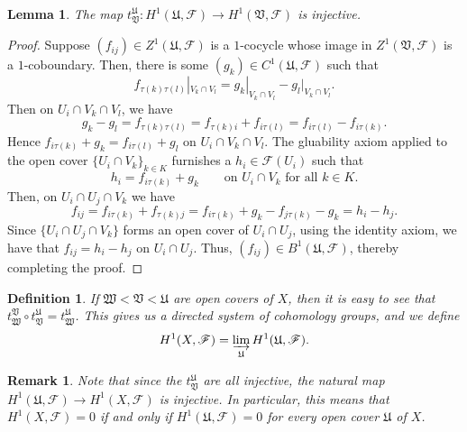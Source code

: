 \documentclass[12pt]{article}
\theoremstyle{thmstyle}
\newtheorem{lemma}[theorem]{Lemma}
\theoremstyle{defstyle}
\newtheorem{definition}[theorem]{Definition}
\newtheorem{remark}[theorem]{Remark}
\newcommand{\frakU}{\mathfrak{U}}
\newcommand{\frakV}{\mathfrak{V}}
\newcommand{\frakW}{\mathfrak{W}}
\newcommand{\scrF}{\mathscr F}
\begin{document}
\begin{lemma}
    The map $t^{\frakU}_{\frakV}: H^1(\frakU,\scrF)\to H^1(\frakV,\scrF)$ is injective.
\end{lemma}
\begin{proof}
    Suppose $(f_{ij})\in Z^1(\frakU,\scrF)$ is a $1$-cocycle whose image in $Z^1(\frakV,\scrF)$ is a $1$-coboundary. Then, there is some $(g_k)\in C^1(\frakU,\scrF)$ such that 
    \begin{equation*}
        f_{\tau(k)\tau(l)}|_{V_k\cap V_l} = g_k|_{V_k\cap V_l} - g_l|_{V_k\cap V_l}.
    \end{equation*}
    Then on $U_i\cap V_k\cap V_l$, we have 
    \begin{equation*}
        g_k - g_l = f_{\tau(k)\tau(l)} = f_{\tau(k)i} + f_{i\tau(l)} = f_{i\tau(l)} - f_{i\tau(k)}.
    \end{equation*}
    Hence $f_{i\tau(k)} + g_k = f_{i\tau(l)} + g_l$ on $U_i\cap V_k\cap V_l$. The gluability axiom applied to the open cover $\{U_i\cap V_k\}_{k\in K}$ furnishes a $h_i\in\scrF(U_i)$ such that 
    \begin{equation*}
        h_i = f_{i\tau(k)} + g_k\qquad\text{on } U_i\cap V_k\text{ for all }k\in K.
    \end{equation*}
    Then, on $U_i\cap U_j\cap V_k$ we have 
    \begin{equation*}
        f_{ij} = f_{i\tau(k)} + f_{\tau(k)j} = f_{i\tau(k)} + g_k - f_{j\tau(k)} - g_k = h_i - h_j.
    \end{equation*}
    Since $\{U_i\cap U_j\cap V_k\}$ forms an open cover of $U_i\cap U_j$, using the identity axiom, we have that $f_{ij} = h_i - h_j$ on $U_i\cap U_j$. Thus, $(f_{ij})\in B^1(\frakU,\scrF)$, thereby completing the proof.
\end{proof}

\begin{definition}
    If $\frakW < \frakV < \frakU$ are open covers of $X$, then it is easy to see that $t^{\frakV}_{\frakW}\circ t^{\frakU}_{\frakV} = t^{\frakU}_{\frakW}$. This gives us a directed system of cohomology groups, and we define 
    \begin{equation*}
        H^1(X,\scrF) = \varinjlim_{\frakU} H^1(\frakU,\scrF).
    \end{equation*}
\end{definition}
\begin{remark}
    Note that since the $t^{\frakU}_{\frakV}$ are all injective, the natural map $H^1(\frakU,\scrF)\to H^1(X,\scrF)$ is injective. In particular, this means that $H^1(X,\scrF) = 0$ if and only if $H^1(\frakU,\scrF) = 0$ for every open cover $\frakU$ of $X$.
\end{remark}
\end{document}
